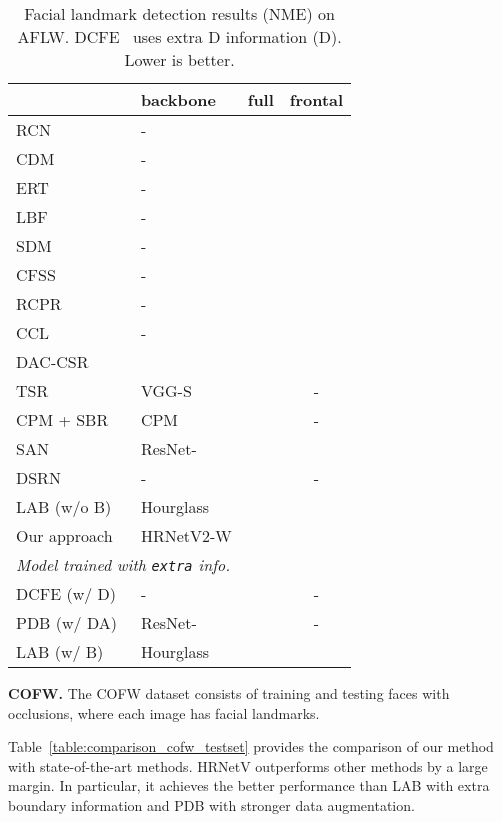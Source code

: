 \documentclass[10pt,twocolumn,letterpaper]{article}
\begin{document}
\renewcommand{\arraystretch}{1.3}
\begin{table}[t]
\setlength{\tabcolsep}{12.5pt}
\scriptsize
\centering
\caption{Facial landmark detection results (NME) on AFLW.
DCFE~\cite{ValleBVB18} uses extra D information (D). Lower is better.}
\label{table:comparison_aflw_testset}
\begin{tabular}{l|l|c|c }
\hline \noalign{\smallskip}
 & backbone &  full &  frontal \\
\hline

\hline
RCN \cite{HonariYVP16} &- &  & \\
CDM \cite{YuHZYM13} & -&  & \\
ERT \cite{KazemiS14}&- &  & \\
LBF \cite{RenCW014} & -&  & \\
SDM \cite{XiongT13} &- &  & \\
CFSS \cite{ZhuLLT15}&- &  &  \\
RCPR \cite{Burgos-ArtizzuPD13}&- & & \\
CCL \cite{ZhuLLT16}&- & & \\
DAC-CSR \cite{FengKC0W17}& & & \\
TSR \cite{LvSXCZ17}&VGG-S & & - \\
CPM + SBR \cite{DongYWW0S18}& CPM &&-\\
SAN \cite{DongYO018}& ResNet- & & \\
DSRN \cite{MiaoZLDAH18}& - & & -\\
LAB (w/o B) \cite{Wu0YWC018}& Hourglass &  & \\
\hline
Our approach & HRNetV2-W &  &  \\
\hline

\hline
\multicolumn{3}{l}{
\emph {Model trained with \texttt{extra} info.}}\\
\hline
DCFE (w/ D)~\cite{ValleBVB18}& - & & - \\
PDB (w/ DA)~\cite{FengKA0W18}& ResNet-& & -\\
LAB (w/ B)~\cite{Wu0YWC018}& Hourglass & & \\
\hline
\end{tabular}
\end{table}

\vspace{.1cm}
\noindent\textbf{COFW.}
The COFW dataset \cite{Burgos-ArtizzuPD13}
consists of  training
and  testing faces
with occlusions,
where each image has  facial landmarks.

Table~\ref{table:comparison_cofw_testset} provides the comparison of our method with state-of-the-art methods.
HRNetV outperforms other methods by a large margin.
In particular, it achieves the better performance than LAB with
extra boundary information and PDB with stronger data augmentation.
\end{document}

